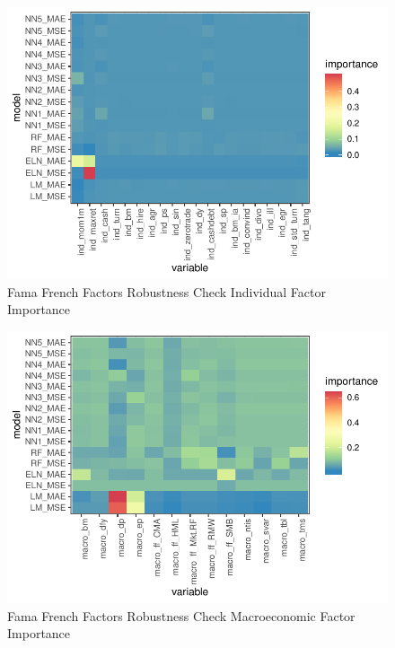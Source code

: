 \documentclass[11pt, a4paper, table]{article}
\begin{document}




\FloatBarrier


\begin{figure}
	\includegraphics[]{../Results/empirical_ff/empirical_all_sample_vi_ind.pdf}
	\caption{Fama French Factors Robustness Check Individual Factor Importance}
\end{figure}

\begin{figure}
	\includegraphics[]{../Results/empirical_ff/empirical_sample_all_vi_macro.pdf}
	\caption{Fama French Factors Robustness Check Macroeconomic Factor Importance}
\end{figure}
\end{document}
